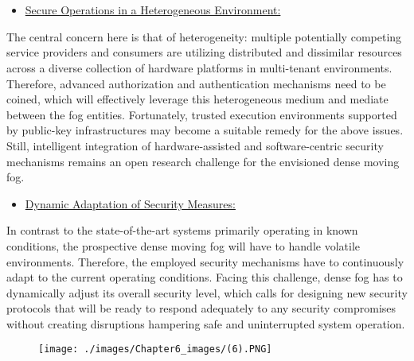 \documentclass[11pt]{article}
\begin{document}
\newpage

\section*{}

\begin{itemize}
\item {\large \uline{Secure Operations in a Heterogeneous Environment:}}
\end{itemize}

The central concern here is that of heterogeneity: multiple potentially competing service providers and consumers are utilizing distributed and dissimilar resources across a diverse collection of hardware platforms in multi-tenant environments. Therefore, advanced authorization and authentication mechanisms need to be coined, which will effectively leverage this heterogeneous medium and mediate between the fog entities. Fortunately, trusted execution environments supported by public-key infrastructures may become a suitable remedy for the above issues. Still, intelligent integration of hardware-assisted and software-centric security mechanisms remains an open research challenge for the envisioned dense moving fog.

\begin{itemize}
\item {\large \uline{Dynamic Adaptation of Security Measures:}}
\end{itemize}

In contrast to the state-of-the-art systems primarily operating in known conditions, the prospective dense moving fog will have to handle volatile environments. Therefore, the employed security mechanisms have to continuously adapt to the current operating conditions. Facing this challenge, dense fog has to dynamically adjust its overall security level, which calls for designing new security protocols that will be ready to respond adequately to any security compromises without creating disruptions hampering safe and uninterrupted system operation.

\vspace{1\baselineskip}
{\large \begin{figure}[H]
\centering
\texttt{[image: ./images/Chapter6\_images/(6).PNG]}
\end{figure}
}
\end{document}
